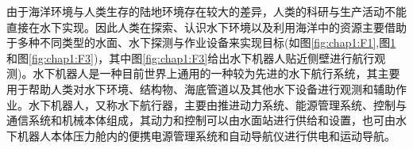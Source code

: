 \begin{figure}
\centering
{}
\label{fig:chap1:F2}
\end{figure}

由于海洋环境与人类生存的陆地环境存在较大的差异，人类的科研与生产活动不能直接在水下实现。因此人类在探索、认识水下环境以及利用海洋中的资源主要借助于多种不同类型的水面、水下探测与作业设备来实现目标(如图\ref{fig:chap1:F1},图\ref{fig:chap1:F2}和图\ref{fig:chap1:F3})，其中图\ref{fig:chap1:F3}给出水下机器人贴近侧壁进行航行观测)\cite{oien2016dynamic,knausgaard2013development,drozdik2015dynamic}。水下机器人是一种目前世界上通用的一种较为先进的水下航行系统，其主要用于帮助人类对水下环境、结构物、海底管道以及其他水下设备进行观测和辅助作业\cite{fossen1994guidance,Fossen2002Marine,berg2012development,drozdik2015dynamic,feng2005intros}。水下机器人，又称水下航行器，主要由推进动力系统、能源管理系统、控制与通信系统和机械本体组成，其动力和控制可以由水面站进行供给和设置，也可由水下机器人本体压力舱内的便携电源管理系统和自动导航仪进行供电和运动导航\cite{fossen1994guidance}。

